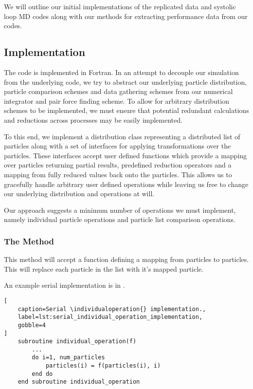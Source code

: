 We will outline our initial implementations of
the replicated data and systolic loop MD codes
along with our methods for extracting performance data from our codes.

\subsection{Implementation}
\label{sec:methodology:subsec:implementation}

The code is implemented in Fortran.
%
In an attempt to decouple our simulation from the underlying code,
we try to abstract our underlying
particle distribution,
particle comparison schemes and
data gathering schemes
from our numerical integrator and pair force finding scheme.
%
To allow for arbitrary distribution schemes to be implemented,
we must ensure that potential redundant calculations and reductions
across processes may be easily implemented.

To this end, we implement a distribution class
representing a distributed list of particles
along with a set of interfaces for applying transformations over the particles.
%
These interfaces accept user defined functions which provide
a mapping over particles returning partial results,
predefined reduction operators and
a mapping from fully reduced values back onto the particles.
%
This allows us to gracefully handle arbitrary user defined operations while
leaving us free to change our underlying distribution and operations
at will.

%
Our approach suggests a minimum number of operations we must implement,
namely individual particle operations and particle list comparison
operations.


\subsubsection{The \individualoperation{} Method}
\label{sec:the_individual_operation_method}

This method will accept a function defining a mapping from
particles to particles.
This will replace each particle in the list with it's mapped
particle.

An example serial implementation is in
.

\begin{lstlisting}[
    caption=Serial \individualoperation{} implementation.,
    label=lst:serial_individual_operation_implementation,
    gobble=4
]
    subroutine individual_operation(f)
        ...
        do i=1, num_particles
            particles(i) = f(particles(i), i)
        end do
    end subroutine individual_operation
\end{lstlisting}

